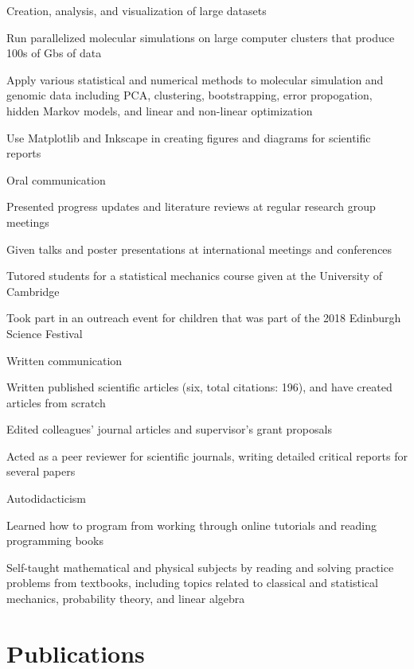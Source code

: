 \documentclass[10pt]{article}
\begin{document}
\skill
    {Creation, analysis, and visualization of large datasets}
    {
        \item Run parallelized molecular simulations on large computer clusters that produce 100s of Gbs of data
        \item Apply various statistical and numerical methods to molecular simulation and genomic data including PCA, clustering, bootstrapping, error propogation, hidden Markov models, and linear and non-linear optimization
        \item Use Matplotlib and Inkscape in creating figures and diagrams for scientific reports
    }
    \vspace{0.3cm}

\skill
    {Oral communication}
    {
        \item Presented progress updates and literature reviews at regular research group meetings
        \item Given talks and poster presentations at international meetings and conferences
        \item Tutored students for a statistical mechanics course given at the University of Cambridge
        \item Took part in an outreach event for children that was part of the 2018 Edinburgh Science Festival
    }
    \vspace{0.3cm}

\skill
    {Written communication}
    {
        \item Written published scientific articles (six, total citations: 196), and have created articles from scratch
        \item Edited colleagues' journal articles and supervisor's grant proposals
        \item Acted as a peer reviewer for scientific journals, writing detailed critical reports for several papers
    }
    \vspace{0.3cm}

\skill
    {Autodidacticism}
    {
        \item Learned how to program from working through online tutorials and reading programming books
        \item Self-taught mathematical and physical subjects by reading and solving practice problems from textbooks, including topics related to classical and statistical mechanics, probability theory, and linear algebra
    }

\section{Publications}
\vspace{-0.2cm}
\end{document}
